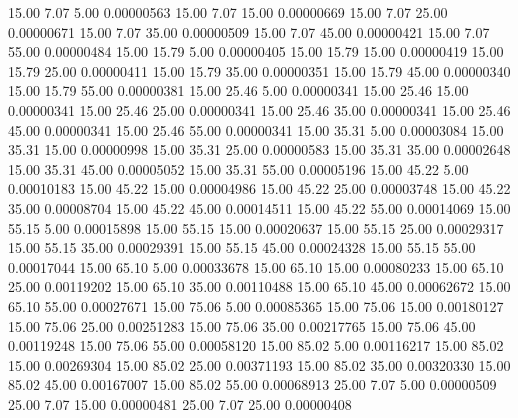      15.00      7.07      5.00     0.00000563
     15.00      7.07     15.00     0.00000669
     15.00      7.07     25.00     0.00000671
     15.00      7.07     35.00     0.00000509
     15.00      7.07     45.00     0.00000421
     15.00      7.07     55.00     0.00000484
     15.00     15.79      5.00     0.00000405
     15.00     15.79     15.00     0.00000419
     15.00     15.79     25.00     0.00000411
     15.00     15.79     35.00     0.00000351
     15.00     15.79     45.00     0.00000340
     15.00     15.79     55.00     0.00000381
     15.00     25.46      5.00     0.00000341
     15.00     25.46     15.00     0.00000341
     15.00     25.46     25.00     0.00000341
     15.00     25.46     35.00     0.00000341
     15.00     25.46     45.00     0.00000341
     15.00     25.46     55.00     0.00000341
     15.00     35.31      5.00     0.00003084
     15.00     35.31     15.00     0.00000998
     15.00     35.31     25.00     0.00000583
     15.00     35.31     35.00     0.00002648
     15.00     35.31     45.00     0.00005052
     15.00     35.31     55.00     0.00005196
     15.00     45.22      5.00     0.00010183
     15.00     45.22     15.00     0.00004986
     15.00     45.22     25.00     0.00003748
     15.00     45.22     35.00     0.00008704
     15.00     45.22     45.00     0.00014511
     15.00     45.22     55.00     0.00014069
     15.00     55.15      5.00     0.00015898
     15.00     55.15     15.00     0.00020637
     15.00     55.15     25.00     0.00029317
     15.00     55.15     35.00     0.00029391
     15.00     55.15     45.00     0.00024328
     15.00     55.15     55.00     0.00017044
     15.00     65.10      5.00     0.00033678
     15.00     65.10     15.00     0.00080233
     15.00     65.10     25.00     0.00119202
     15.00     65.10     35.00     0.00110488
     15.00     65.10     45.00     0.00062672
     15.00     65.10     55.00     0.00027671
     15.00     75.06      5.00     0.00085365
     15.00     75.06     15.00     0.00180127
     15.00     75.06     25.00     0.00251283
     15.00     75.06     35.00     0.00217765
     15.00     75.06     45.00     0.00119248
     15.00     75.06     55.00     0.00058120
     15.00     85.02      5.00     0.00116217
     15.00     85.02     15.00     0.00269304
     15.00     85.02     25.00     0.00371193
     15.00     85.02     35.00     0.00320330
     15.00     85.02     45.00     0.00167007
     15.00     85.02     55.00     0.00068913
     25.00      7.07      5.00     0.00000509
     25.00      7.07     15.00     0.00000481
     25.00      7.07     25.00     0.00000408
